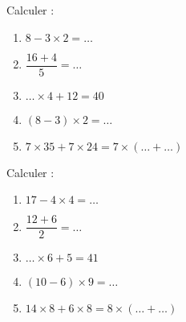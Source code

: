 \begin{minipage}{0.485\textwidth}

    Calculer :
    \begin{enumerate}
        \item
            \( 8-3\times 2=\ldots\)
        \item
            \( \dfrac{ 16+4 }{ 5 }=\ldots\)
        \item
            \( \ldots \times 4+12=40\)
        \item
            \( (8-3)\times 2=\ldots\)
        \item
            \( 7\times 35+7\times 24=7\times(\ldots +\ldots)\)
    \end{enumerate}

\end{minipage}
\begin{minipage}{0.485\textwidth}

    Calculer :
    \begin{enumerate}
        \item
            \( 17-4\times 4=\ldots\)
        \item
            \( \dfrac{ 12+6 }{ 2 }=\ldots\)
        \item
            \( \ldots \times 6+5=41\)
        \item
            \( (10-6)\times 9=\ldots\)
        \item
            \( 14\times 8+6\times 8=  8\times (\ldots +\ldots)  \)
    \end{enumerate}

\end{minipage}
